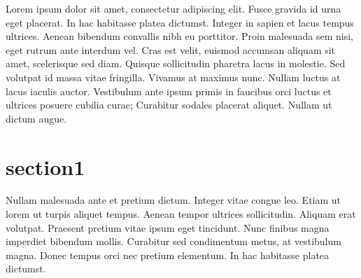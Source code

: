 Lorem ipsum dolor sit amet, consectetur adipiscing elit. Fusce gravida id urna eget placerat. In hac habitasse platea dictumst. Integer in sapien et lacus tempus ultrices. Aenean bibendum convallis nibh eu porttitor. Proin malesuada sem nisi, eget rutrum ante interdum vel. Cras est velit, euismod accumsan aliquam sit amet, scelerisque sed diam. Quisque sollicitudin pharetra lacus in molestie. Sed volutpat id massa vitae fringilla. Vivamus at maximus nunc. Nullam luctus at lacus iaculis auctor. Vestibulum ante ipsum primis in faucibus orci luctus et ultrices posuere cubilia curae; Curabitur sodales placerat aliquet. Nullam ut dictum augue.

\section{section1}
Nullam malesuada ante et pretium dictum. Integer vitae congue leo. Etiam ut lorem ut turpis aliquet tempus. Aenean tempor ultrices sollicitudin. Aliquam erat volutpat. Praesent pretium vitae ipsum eget tincidunt. Nunc finibus magna imperdiet bibendum mollis. Curabitur sed condimentum metus, at vestibulum magna. Donec tempus orci nec pretium elementum. In hac habitasse platea dictumst.\cite{book1}